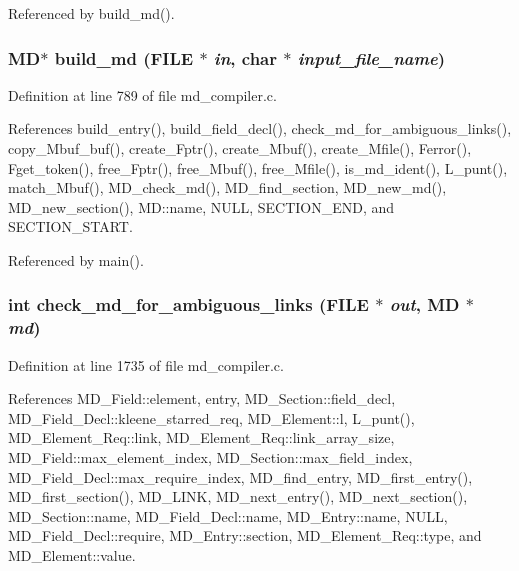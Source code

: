 Referenced by build\_\-md().
\subsubsection{\setlength{\rightskip}{0pt plus 5cm}\bf{MD}$\ast$ build\_\-md (FILE $\ast$ {\em in}, char $\ast$ {\em input\_\-file\_\-name})}\label{md__compiler_8h_3c0442d466df2078d29749bbff847c0d}




Definition at line 789 of file md\_\-compiler.c.

References build\_\-entry(), build\_\-field\_\-decl(), check\_\-md\_\-for\_\-ambiguous\_\-links(), copy\_\-Mbuf\_\-buf(), create\_\-Fptr(), create\_\-Mbuf(), create\_\-Mfile(), Ferror(), Fget\_\-token(), free\_\-Fptr(), free\_\-Mbuf(), free\_\-Mfile(), is\_\-md\_\-ident(), L\_\-punt(), match\_\-Mbuf(), MD\_\-check\_\-md(), MD\_\-find\_\-section, MD\_\-new\_\-md(), MD\_\-new\_\-section(), MD::name, NULL, SECTION\_\-END, and SECTION\_\-START.

Referenced by main().
\subsubsection{\setlength{\rightskip}{0pt plus 5cm}int check\_\-md\_\-for\_\-ambiguous\_\-links (FILE $\ast$ {\em out}, \bf{MD} $\ast$ {\em md})}\label{md__compiler_8h_5dc602835cc716539a36da4c7fe7fa45}




Definition at line 1735 of file md\_\-compiler.c.

References MD\_\-Field::element, entry, MD\_\-Section::field\_\-decl, MD\_\-Field\_\-Decl::kleene\_\-starred\_\-req, MD\_\-Element::l, L\_\-punt(), MD\_\-Element\_\-Req::link, MD\_\-Element\_\-Req::link\_\-array\_\-size, MD\_\-Field::max\_\-element\_\-index, MD\_\-Section::max\_\-field\_\-index, MD\_\-Field\_\-Decl::max\_\-require\_\-index, MD\_\-find\_\-entry, MD\_\-first\_\-entry(), MD\_\-first\_\-section(), MD\_\-LINK, MD\_\-next\_\-entry(), MD\_\-next\_\-section(), MD\_\-Section::name, MD\_\-Field\_\-Decl::name, MD\_\-Entry::name, NULL, MD\_\-Field\_\-Decl::require, MD\_\-Entry::section, MD\_\-Element\_\-Req::type, and MD\_\-Element::value.

